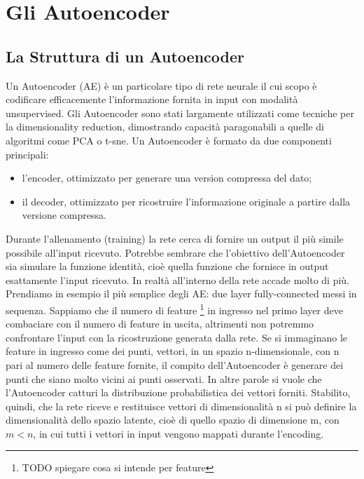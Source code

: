 
\chapter{Gli Autoencoder}

\section{La Struttura di un Autoencoder}
Un Autoencoder (AE) è un particolare tipo di rete neurale il cui scopo è codificare efficacemente l'informazione fornita in input con modalità unsupervised.
Gli Autoencoder sono stati largamente utilizzati come tecniche per la dimensionality reduction, dimostrando capacità paragonabili a quelle di algoritmi come PCA o t-sne.
Un Autoencoder è formato da due componenti principali:
\begin{itemize}
    \item l'encoder, ottimizzato per generare una version compressa del dato;
    \item il decoder, ottimizzato per ricostruire l'informazione originale a partire dalla versione compressa.
\end{itemize}
Durante l'allenamento (training) la rete cerca di fornire un output il più simile possibile all'input ricevuto.
Potrebbe sembrare che l'obiettivo %
dell'Autoencoder sia simulare la funzione identità, cioè quella funzione che fornisce in output esattamente l'input ricevuto.
In realtà all'interno della rete accade molto di più.
Prendiamo in esempio il più semplice degli AE: due layer fully-connected messi in sequenza.
Sappiamo che il numero di feature \footnote{TODO spiegare cosa si intende per feature} in ingresso nel primo layer deve combaciare con il numero di feature in uscita, altrimenti non potremmo confrontare l'input con la ricostruzione generata dalla rete.
Se si immaginano le feature in ingresso come dei punti, vettori, in un spazio n-dimensionale, con n pari al numero delle feature fornite, il compito dell'Autoencoder è generare dei punti che siano molto vicini ai punti osservati.
In altre parole si vuole che l'Autoencoder catturi la distribuzione probabilistica dei vettori forniti.
Stabilito, quindi, che la rete riceve e restituisce vettori di dimensionalità n si può definire la dimensionalità dello spazio latente, cioè di quello spazio di dimensione m, con $m < n$, in cui tutti i  vettori in input vengono mappati durante l'encoding.
